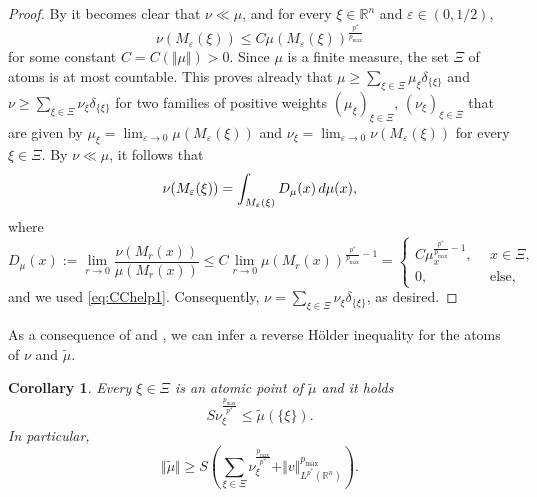 \documentclass[11pt]{amsart}
\theoremstyle{plain}
\newtheorem{corollary}[theorem]{Corollary}
\theoremstyle{definition}
\numberwithin{equation}{section}
\renewcommand{\d}{\textnormal{d}}
\newcommand{\R}{\mathbb{R}}
\newcommand{\eps}{\varepsilon}
\begin{document}
\begin{proof}
By  it becomes clear that $\nu \ll \mu$, and for every $\xi \in \R^n$ and $\eps \in (0,1/2)$,
\begin{equation}
\label{eq:CChelp1}
\nu(M_{\eps}(\xi)) \le C \mu(M_{\eps}(\xi))^{\frac{p^{\ast}}{p_{\max}}}
\end{equation}
for some constant $C = C(\Vert \mu \Vert) > 0$. 
Since $\mu$ is a finite measure, the set $\Xi$ of atoms is at most countable. This proves already that $\mu \ge \sum_{\xi \in \Xi} \mu_{\xi}\delta_{\{\xi\}}$ and $\nu \ge \sum_{\xi \in \Xi} \nu_{\xi}\delta_{\{\xi\}}$ for two families of positive weights $(\mu_{\xi})_{\xi \in \Xi}$, $(\nu_{\xi})_{\xi \in \Xi}$ that are given by $\mu_{\xi} = \lim_{\eps \to 0} \mu(M_{\eps}(\xi))$ and $\nu_{\xi} = \lim_{\eps \to 0} \nu(M_{\eps}(\xi))$ for every $\xi \in \Xi$. By $\nu \ll \mu$, it follows that 
\begin{equation*}
\nu(M_{\eps}(\xi)) = \int_{M_{\eps}(\xi)} D_{\mu}(x)  \, \d \mu(x),
\end{equation*}
where 
\begin{equation*}
D_{\mu}(x) := \lim_{r \to 0} \frac{\nu(M_{r}(x))}{\mu(M_{r}(x))} \le C \lim_{r \to 0} \mu(M_{r}(x))^{\frac{p^{\ast}}{p_{\max}}-1} = \begin{cases}
C\mu_{x}^{\frac{p^{\ast}}{p_{\max}}-1},& ~~ x \in \Xi,\\
0,& ~~ \text{else},
\end{cases}
\end{equation*}
and we used \eqref{eq:CChelp1}. Consequently, $\nu = \sum_{\xi \in \Xi} \nu_{\xi}\delta_{\{\xi\}}$, as desired.
\end{proof}

As a consequence of  and , we can infer a reverse H\"older inequality for the atoms of $\nu$ and $\widetilde{\mu}$.

\begin{corollary}
\label{cor:CC2}
Every $\xi \in \Xi$ is an atomic point of $\widetilde{\mu}$ and it holds
\begin{equation}
\label{eq:finallemmaHelp2}
S \nu_{\xi}^{\frac{p_{\max}}{p^{\ast}}} \le \widetilde{\mu}(\{\xi\}).
\end{equation}
In particular,
\begin{equation*}
\Vert \widetilde{\mu} \Vert \ge S \left(\sum_{\xi \in \Xi} \nu_{\xi}^{\frac{p_{\max}}{p^{\ast}}} +  \Vert v \Vert_{L^{p^{\ast}}(\R^n)}^{p_{\max}}\right).
\end{equation*}
\end{corollary}
\end{document}
